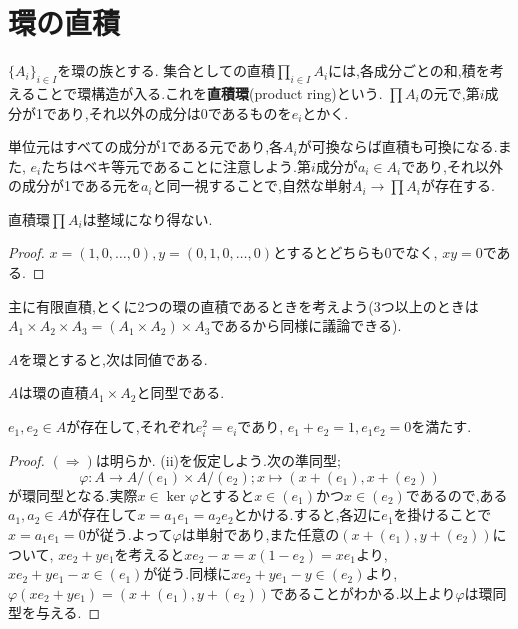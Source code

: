 \section{環の直積}

\begin{defi}[直積環]
	$\{A_i\}_{i\in I}$を環の族とする. 集合としての直積$\prod_{i\in I} A_i$には,各成分ごとの和,積を考えることで環構造が入る.これを\textbf{直積環}(product ring)という. $\prod A_i$の元で,第$i$成分が1であり,それ以外の成分は0であるものを$e_i$とかく.
\end{defi}

単位元はすべての成分が1である元であり,各$A_i$が可換ならば直積も可換になる.また, $e_i$たちはベキ等元であることに注意しよう.第$i$成分が$a_i\in A_i$であり,それ以外の成分が1である元を$a_i$と同一視することで,自然な単射$A_i\to\prod A_i$が存在する.

\begin{lem}
	直積環$\prod A_i$は整域になり得ない.
\end{lem}

\begin{proof}
	$x=(1,0,\dots,0),y=(0,1,0,\dots,0)$とするとどちらも0でなく, $xy=0$である.
\end{proof}

主に有限直積,とくに2つの環の直積であるときを考えよう(3つ以上のときは$A_1\times A_2\times A_3=(A_1\times A_2)\times A_3$であるから同様に議論できる).


\begin{prop}
	$A$を環とすると,次は同値である.
	\begin{sakura}
		\item $A$は環の直積$A_1\times A_2$と同型である.
		\item $e_1,e_2\in A$が存在して,それぞれ$e_i^2=e_i$であり, $e_1+e_2=1,e_1e_2=0$を満たす.
	\end{sakura}
\end{prop}

\begin{proof}
	$(\Longrightarrow)$は明らか. (ii)を仮定しよう.次の準同型;
	\[\varphi:A\to A/(e_1)\times A/(e_2);x\mapsto (x+(e_1),x+(e_2))\]
	が環同型となる.実際$x\in\ker\varphi$とすると$x\in (e_1)$かつ$x\in (e_2)$であるので,ある$a_1,a_2\in A$が存在して$x=a_1e_1=a_2e_2$とかける.すると,各辺に$e_1$を掛けることで$x=a_1e_1=0$が従う.よって$\varphi$は単射であり,また任意の$(x+(e_1),y+(e_2))$について, $xe_2+ye_1$を考えると$xe_2-x=x(1-e_2)=xe_1$より, $xe_2+ye_1-x\in (e_1)$が従う.同様に$xe_2+ye_1-y\in (e_2)$より, $\varphi(xe_2+ye_1)=(x+(e_1),y+(e_2))$であることがわかる.以上より$\varphi$は環同型を与える.
\end{proof}


